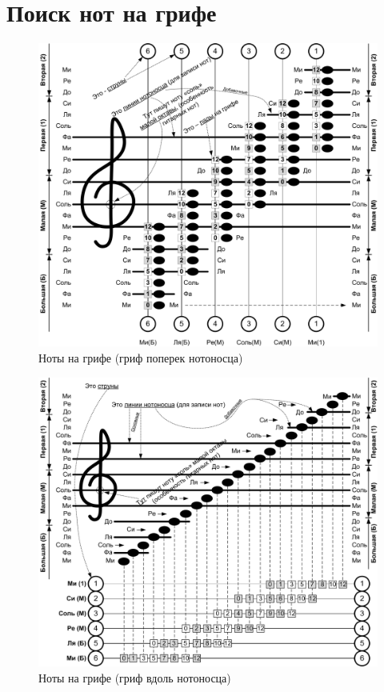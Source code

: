 \section{Поиск нот на грифе}

\begin{figure}[!ht]
    \centering
    \includegraphics[width=\textwidth]{fig/lad-by-notes} 
    \caption{Ноты на грифе (гриф поперек нотоносца)}\label{fig:ladByNotes}
\end{figure} 

\begin{figure}[!ht]
    \centering
    \includegraphics[width=\textwidth]{fig/lad-by-griph} 
    \caption{Ноты на грифе (гриф вдоль нотоносца)}\label{fig:ladByGriph}
\end{figure} 

